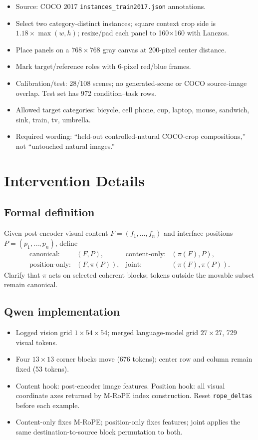 \documentclass[10pt,twocolumn,letterpaper]{article}
\begin{document}
\begin{itemize}[leftmargin=*]
    \item Source: COCO 2017 \texttt{instances\_train2017.json} annotations.
    \item Select two category-distinct instances; square context crop side is $1.18\times\max(w,h)$; resize/pad each panel to 160$\times$160 with Lanczos.
    \item Place panels on a $768\times768$ gray canvas at 200-pixel center distance.
    \item Mark target/reference roles with 6-pixel red/blue frames.
    \item Calibration/test: 28/108 scenes; no generated-scene or COCO source-image overlap.  Test set has 972 condition--task rows.
    \item Allowed target categories: bicycle, cell phone, cup, laptop, mouse, sandwich, sink, train, tv, umbrella.
    \item Required wording: ``held-out controlled-natural COCO-crop compositions,'' not ``untouched natural images.''
\end{itemize}

\section{Intervention Details}

\subsection{Formal definition}

Given post-encoder visual content $F=(f_1,\ldots,f_n)$ and interface positions $P=(p_1,\ldots,p_n)$, define
\begin{align}
\text{canonical}:&(F,P), &
\text{content-only}:&(\pi(F),P),\\
\text{position-only}:&(F,\pi(P)), &
\text{joint}:&(\pi(F),\pi(P)).
\end{align}
Clarify that $\pi$ acts on selected coherent blocks; tokens outside the movable subset remain canonical.

\subsection{Qwen implementation}

\begin{itemize}[leftmargin=*]
    \item Logged vision grid $1\times54\times54$; merged language-model grid $27\times27$, 729 visual tokens.
    \item Four $13\times13$ corner blocks move (676 tokens); center row and column remain fixed (53 tokens).
    \item Content hook: post-encoder image features.  Position hook: all visual coordinate axes returned by M-RoPE index construction.  Reset \texttt{rope\_deltas} before each example.
    \item Content-only fixes M-RoPE; position-only fixes features; joint applies the same destination-to-source block permutation to both.
\end{itemize}
\end{document}
